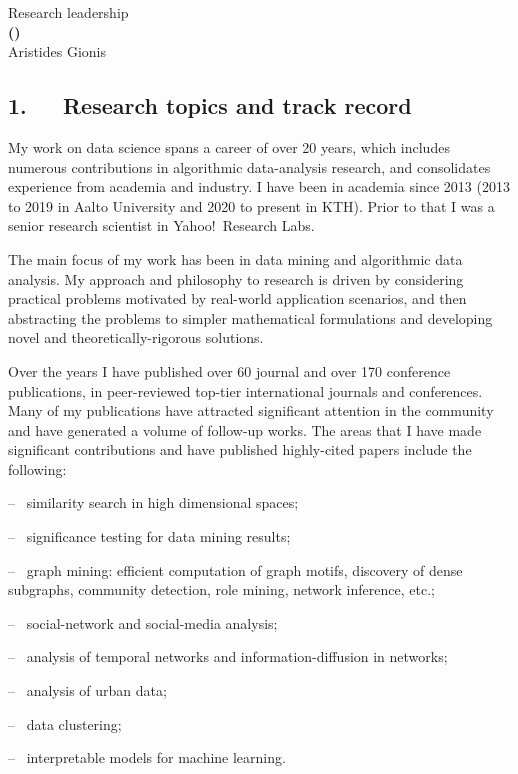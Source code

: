 \documentclass[a4paper,11pt]{article}
\begin{document}
\begin{center} 
{\Large Research leadership} \vspace{3mm}\\
{\Large\bf {\proposaltitle} {\sc (}{\acronymtitle}{\sc )}}  \vspace{3mm} \\
{\Large Aristides Gionis} 
\end{center}


\subsection*{1.~~~Research topics and track record}

My work on data science spans a career of over 20 years, 
which includes numerous contributions in algorithmic data-analysis research, 
and consolidates experience from academia and industry.
I have been in academia since 2013 
(2013 to 2019 in Aalto University and 2020 to present in KTH).
Prior to that I was a senior research scientist in Yahoo!\ Research Labs. 

The main focus of my work has been in data mining and algorithmic data analysis. 
My approach and philosophy to research is driven by considering practical problems 
motivated by real-world application scenarios, 
and then abstracting the problems to simpler mathematical formulations 
and developing novel and theoretically-rigorous solutions.

Over the years I have published over 60 journal and over 170 conference publications, 
in peer-reviewed top-tier international journals and conferences.
Many of my publications have attracted significant attention in the community
and have generated a volume of follow-up works.
The areas that I have made significant contributions and 
have published highly-cited papers include the following: 
\squishlist
\item[--~] similarity search in high dimensional spaces; 
\item[--~] significance testing for data mining results; 
\item[--~] graph mining: efficient computation of graph motifs, discovery of dense subgraphs, community detection, role mining, network inference, etc.;
\item[--~] social-network and social-media analysis;
\item[--~] analysis of temporal networks and information-diffusion in networks;
\item[--~] analysis of urban data;
\item[--~] data clustering;
\item[--~] interpretable models for machine learning.
\squishend
\end{document}
